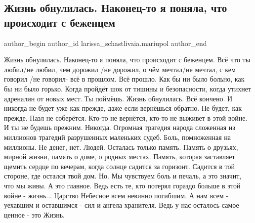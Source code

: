  
 
 
 
 

\subsection{Жизнь обнулилась. Наконец-то я поняла, что происходит с беженцем}
\label{sec:25_04_2022.fb.larissa_schastlivaia.mariupol.1.zhizn_obnulilas}

\ifcmt
 author_begin
   author_id larissa_schastlivaia.mariupol
 author_end
\fi


Жизнь обнулилась. Наконец-то я поняла, что происходит с беженцем. Всё что ты
любил/не любил, чем дорожил /не дорожил, о чём мечтал/не мечтал, с кем говорил
/не говорил- всё в прошлом. Всё прошло. Как бы ни было больно, как бы ни было
горько. Когда пройдёт шок от тишины и безопасности, когда утихнет адреналин от
новых мест. Ты поймёшь. Жизнь обнулилась. Всё кончено. И никогда не будет уже
как прежде, даже если вернёшься обратно. Не будет, как прежде. Пазл не
соберётся. Кто-то не вернётся, кто-то не выживет в этой войне. И ты не будешь
прежним. Никогда. Огромная трагедия народа сложенная из миллионов трагедий
разрушенных маленьких судеб. Боль, помноженная на миллионы. Не денег, нет.
Людей. Осталась только память. Память о друзьях, мирной жизни, память о доме, о
родных местах. Память, которая заставляет щемить сердце по вечерам, когда
солнце садится за горизонт. Садится в той стороне, где остался твой дом. Но. Мы
чувствуем боль и печаль, а это значит, что мы живы. А это главное. Ведь есть
те, кто потерял гораздо больше в этой войне - жизнь... Царство Небесное всем
невинно погибшим. А нам всем - уехавшим и оставшимся - сил и ангела хранителя.
Ведь у нас осталось самое ценное - это Жизнь.
